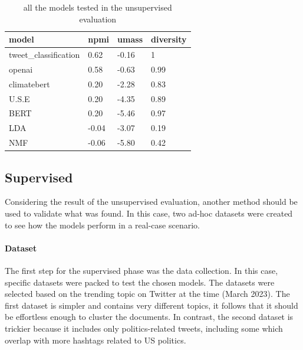 \begin{table}[]
\centering
\begin{tabular}{|llll|}
\hline
\textbf{model}                              & \textbf{npmi} & \textbf{umass} & \textbf{diversity} \\ \hline
\multicolumn{1}{|l|}{tweet\_classification} & 0.62          & -0.16          & 1                  \\
\multicolumn{1}{|l|}{openai}                & 0.58          & -0.63          & 0.99               \\
\multicolumn{1}{|l|}{climatebert}           & 0.20          & -2.28          & 0.83               \\
\multicolumn{1}{|l|}{U.S.E}                 & 0.20          & -4.35          & 0.89               \\
\multicolumn{1}{|l|}{BERT}                  & 0.20          & -5.46          & 0.97               \\
\multicolumn{1}{|l|}{LDA}                   & -0.04         & -3.07          & 0.19               \\
\multicolumn{1}{|l|}{NMF}                   & -0.06         & -5.80          & 0.42               \\ \hline
\end{tabular}
\caption{all the models tested in the unsupervised evaluation}
\label{tab:unsupervised_recap}
\end{table}


\subsection{Supervised}
Considering the result of the unsupervised evaluation, another method should be used to validate what was found. In this case, two ad-hoc datasets were created to see how the models perform in a real-case scenario.
\paragraph{Dataset}

The first step for the supervised phase was the data collection. In this case,  specific datasets were packed to test the chosen models. The datasets were selected based on the trending topic on Twitter at the time (March 2023).
The first dataset is simpler and contains very different topics, it follows that it should be effortless enough to cluster the documents. In contrast, the second dataset is trickier because it includes only politics-related tweets, including some which overlap with more hashtags related to US politics.


